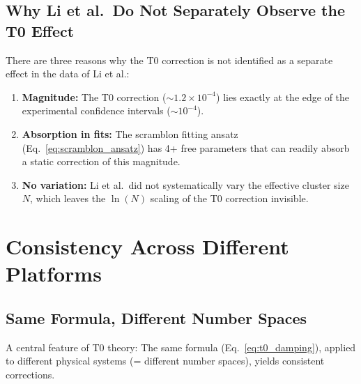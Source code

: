 \subsection{Why Li et al.\ Do Not Separately Observe the T0 Effect}

There are three reasons why the T0 correction is not identified as a separate effect in the data of Li et al.:

\begin{enumerate}
	\item \textbf{Magnitude:} The T0 correction ($\sim 1.2 \times 10^{-4}$) lies exactly at the edge of the experimental confidence intervals ($\sim 10^{-4}$).
	\item \textbf{Absorption in fits:} The scramblon fitting ansatz (Eq.~\ref{eq:scramblon_ansatz}) has 4+ free parameters that can readily absorb a static correction of this magnitude.
	\item \textbf{No variation:} Li et al.\ did not systematically vary the effective cluster size $N$, which leaves the $\ln(N)$ scaling of the T0 correction invisible.
\end{enumerate}


\section{Consistency Across Different Platforms}
\label{sec:crossplatform}

\subsection{Same Formula, Different Number Spaces}

A central feature of T0 theory: The same formula (Eq.~\ref{eq:t0_damping}), applied to different physical systems (= different number spaces), yields consistent corrections.

\begin{table}[h]
	\centering
	\caption{T0 correction factor across different platforms}
	\label{tab:cross_platform}
\end{table}

